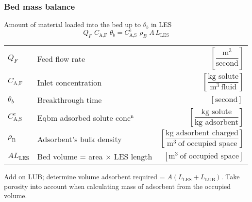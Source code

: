 \begin{frame}\frametitle{Bed mass balance}

	\begin{exampleblock}{Amount of material loaded into the bed up to $\theta_b$ in LES}
		\[Q_F \,\, C_\text{A,F} \,\, \theta_b = C_\text{A,S}^\text{e} \,\, \rho_B  \,\, A \, L_\text{LES} \]  %
	\end{exampleblock}
	
	\begin{tabular}{llr}\vspace{0pt}
		$Q_F $					& Feed flow rate					& $\left[ \dfrac{\text{m}^3}{\text{second}}\right]$ \\ 	\vspace{2pt}
		$C_\text{A,F} $			& Inlet concentration				& $\left[ \dfrac{\text{kg solute}}{\text{m}^3~\text{fluid}}\right]$ \\ 	\vspace{2pt}
		$\theta_b$				& Breakthrough time					& $\left[ \text{second}\right]\,$ \\ 	\vspace{2pt}
		$C_\text{A,S}^{e}$		& Eqbm adsorbed solute conc$^\text{n}$& $\left[ \dfrac{\text{kg solute}}{\text{kg adsorbent}}\right]$ \\ \vspace{2pt}
		$\rho_\text{B}$			& Adsorbent's {\color{purple}bulk density}			& $\left[ \dfrac{\text{kg adsorbent charged}}{\text{m}^3~\text{of occupied space}}\right]$ \\ 	\vspace{2pt}
		$A L_\text{LES}$		& Bed volume = area $\times$ LES length	& $\left[ \text{m}^3~\text{of occupied space}\right]$
	\end{tabular}

	\vspace{6pt}
	{\small \color{myBlue}Add on LUB; determine volume adsorbent required = $A( L_\text{LES}+L_\text{LUB})$.}
	{\small \color{myOrange}Take porosity into account when calculating mass of adsorbent from the occupied volume.}
\end{frame}

